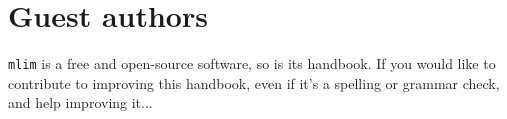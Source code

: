 \section{Guest authors}

\texttt{mlim} is a free and open-source software, so is its handbook. If you would like to contribute to improving this handbook, even if it's a spelling or grammar check,   and help improving it... 